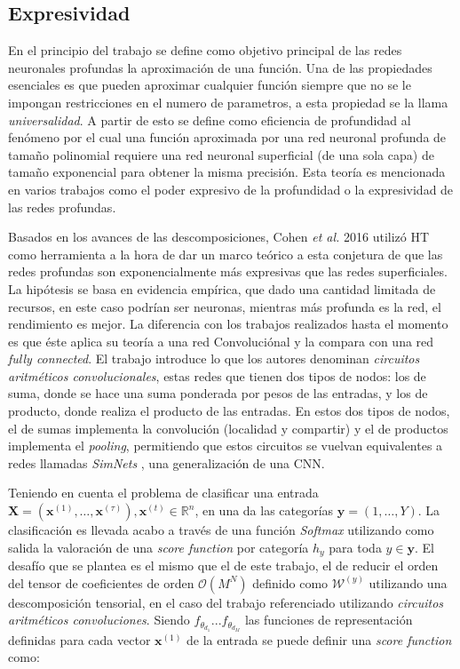 \documentclass[spanish]{article}
\theoremstyle{definition}
\theoremstyle{remark}
\numberwithin{equation}{section}
\numberwithin{equation}{section} %
\begin{document}
\subsection{Expresividad}
\par
En el principio del trabajo se define como objetivo principal de las redes neuronales profundas la aproximación de una función. Una de las propiedades esenciales es que pueden aproximar cualquier función siempre que no se le impongan restricciones en el numero de parametros, a esta propiedad se la llama \textit{universalidad}. A partir de esto se define como eficiencia de profundidad al fenómeno por el cual una función aproximada por una red neuronal profunda de tamaño polinomial requiere una red neuronal superficial (de una sola capa) de tamaño exponencial para obtener la misma precisión. Esta teoría es mencionada en varios trabajos como el poder expresivo de la profundidad o la expresividad de las redes profundas. 
\par
Basados en los avances de las descomposiciones, Cohen \textit{et al.} 2016 \cite{cohen2016expressive} utilizó HT como herramienta a la hora de dar un marco teórico a esta conjetura de que las redes profundas son exponencialmente más expresivas que las redes superficiales. La hipótesis se basa en evidencia empírica, que dado una cantidad limitada de recursos, en este caso podrían ser neuronas, mientras más profunda es la red, el rendimiento es mejor. La diferencia con los trabajos realizados hasta el momento es que éste aplica su teoría a una red Convoluciónal y la compara con una red \textit{fully connected}. El trabajo introduce lo que los autores denominan \textit{circuitos aritméticos convolucionales}, estas redes que tienen dos tipos de nodos: los de suma, donde se hace una suma ponderada por pesos de las entradas, y los de producto, donde realiza el producto de las entradas. En estos dos tipos de nodos, el de sumas implementa la convolución (localidad y compartir) y el de productos implementa el \textit{pooling}, permitiendo que estos circuitos se vuelvan equivalentes a redes llamadas \textit{SimNets} \cite{cohen2014simnets}, una generalización de una CNN. \par
Teniendo en cuenta el problema de clasificar una entrada $\boldsymbol{X} = ( \boldsymbol{x}^{(1)}, \ldots ,\boldsymbol{x}^{(\tau)}), \boldsymbol{x}^{(t)}  \in \mathbb{R} ^{n}$, en una da las categorías $\boldsymbol{y}=(1,\ldots,Y)$. La clasificación es llevada acabo a través de una función \textit{Softmax} utilizando como salida la valoración de una \textit{score function} por categoría $h_y$ para toda $y\in\boldsymbol{y}$. El desafío que se plantea es el mismo que el de este trabajo, el de reducir el orden del tensor de coeficientes de orden $\mathcal{O}(M^N)$ definido como $\mathcal{W}^{(y)}$  utilizando una descomposición tensorial, en el caso del trabajo referenciado utilizando \textit{circuitos aritméticos convoluciones}. Siendo $f_{\theta_{d_1}}...f_{\theta_{d_M}}$ las funciones de representación definidas para cada vector $\boldsymbol{x}^{(1)}$ de la entrada se puede definir una \textit{score function} como:
\end{document}
